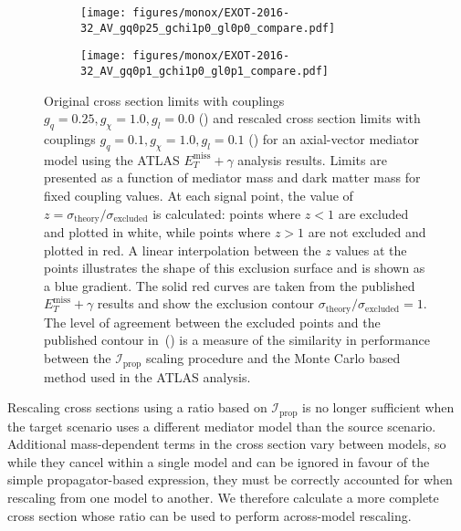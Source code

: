 \documentclass[a4paper, 11pt,notoc]{article}
\newcommand{\MET}{\ensuremath{E_T^\mathrm{miss}}\xspace}
\newcommand{\met}{\MET}
\begin{document}
\begin{figure}[htp!]
  \begin{center}
  \begin{subfigure}[b]{0.49\textwidth}  
    \texttt{[image: figures/monox/EXOT-2016-32\_AV\_gq0p25\_gchi1p0\_gl0p0\_compare.pdf]}
    \caption{}
    \label{subfig:monophoton_A1}
  \end{subfigure}
  \begin{subfigure}[b]{0.49\textwidth}  
    \texttt{[image: figures/monox/EXOT-2016-32\_AV\_gq0p1\_gchi1p0\_gl0p1\_compare.pdf]}
    \caption{}
    \label{subfig:monophoton_A2}  
  \end{subfigure}
  
  \caption{Original cross section limits with couplings $g_q=0.25, g_\chi=1.0, g_l = 0.0$ () and rescaled cross section limits with couplings $g_q=0.1, g_\chi=1.0, g_l = 0.1$ () for an axial-vector mediator model using the ATLAS $\met+\gamma$ analysis results. Limits are presented as a function of mediator mass and dark matter mass for fixed coupling values. At each signal point, the value of $z = \sigma_{\text{theory}}/\sigma_{\text{excluded}}$ is calculated: points where $z<1$ are excluded and plotted in white, while points where $z>1$ are not excluded and plotted in red. A linear interpolation between the $z$ values at the points illustrates the shape of this exclusion surface and is shown as a blue gradient. The solid red curves are taken from the published $\met+\gamma$ results and show the exclusion contour $\sigma_{\text{theory}}/\sigma_{\text{excluded}} = 1$. The level of agreement between the excluded points and the published contour in~() is a measure of the similarity in performance between the $\mathcal{I}_{\text{prop}}$ scaling procedure and the Monte Carlo based method used in the ATLAS analysis.}
  \label{fig:propagator_scaling}
  \end{center}
\end{figure}

Rescaling cross sections using a ratio based on $\mathcal{I}_{\text{prop}}$ is no longer sufficient when the target scenario uses a different mediator model than the source scenario. Additional mass-dependent terms in the cross section vary between models, so while they cancel within a single model and can be ignored in favour of the simple propagator-based expression, they must be correctly accounted for when rescaling from one model to another. We therefore calculate a more complete cross section whose ratio can be used to perform across-model rescaling.
\end{document}

